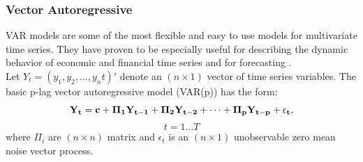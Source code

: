 \subsubsection{Vector Autoregressive}
VAR models are some of the most flexible and easy to use models for multivariate time series. They have proven to be especially useful for describing the dynamic behavior of economic and financial time series and for forecasting \cite{tsay, VAR}. \\
Let $Y_t = (y_1, y_2,...,y_nt)'$ denote an $(n \times 1)$ vector of time series variables. The basic p-lag vector autoregressive model (VAR(p)) has the form:
$$\bf{Y}_t=\bf{c}+\bf{\Pi}_1\bf{Y}_{t-1}+\bf{\Pi}_2\bf{Y}_{t-2}+\cdots+\bf{\Pi}_p\bf{Y}_{t-p}+\epsilon_t,$$ $$t=1\ldots T$$
where $\Pi_i$ are $(n \times n)$ matrix and $\epsilon_t$ is an $(n \times 1)$ unobservable zero mean noise vector process.

